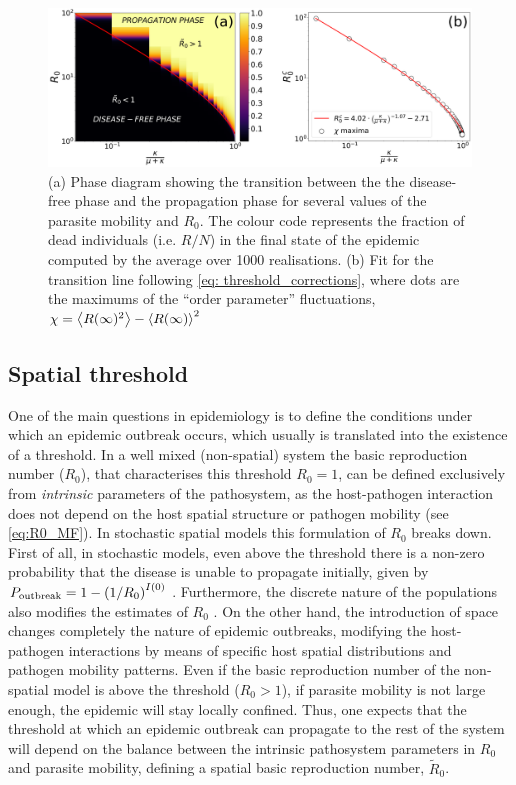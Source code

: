 \begin{figure}[t!]
    \centering
    \includegraphics[width=1\textwidth]{Figures/PhaseDiagram.png}
    \caption{(a) Phase diagram showing the transition between the the
        disease-free phase and the propagation phase for several values of the
        parasite
        mobility and $R_0$. The colour code represents the fraction of dead
        individuals
        (i.e. $R/N$) in the final state of the epidemic computed by the average
        over
        1000 realisations. (b) Fit for the transition line following \cref{eq:
            threshold_corrections}, where dots are the maximums of the ``order
        parameter''
        fluctuations, $\chi=\left<{R(\infty})^2\right>-\left<R(\infty)\right>^2$}
    \label{fig:Phase_diagram}
\end{figure}

\subsection{Spatial threshold}

One of the main questions in epidemiology is to define the conditions under
which an epidemic outbreak occurs, which usually is translated into the
existence of a threshold. In a well mixed (non-spatial) system the basic
reproduction number ($R_0$), that characterises this threshold $R_0=1$, can be
defined exclusively from \textit{intrinsic} parameters of the pathosystem, as
the host-pathogen interaction does not depend on the host spatial structure or
pathogen mobility (see \cref{eq:R0_MF}). In stochastic spatial models this
formulation of $R_0$ breaks down. First of all, in stochastic models, even
above the threshold there is a non-zero probability that the disease is unable
to propagate initially, given by
$P_{\textrm{outbreak}}=1-\left(1/R_0\right)^{I(0)}$ \cite{Brauer2008}.
Furthermore, the discrete nature of the populations also modifies the estimates
of $R_0$ \cite{KEELING200051}. On the other hand, the introduction of space
changes completely the nature of epidemic outbreaks, modifying the
host-pathogen interactions by means of specific host spatial distributions and
pathogen mobility patterns. Even if the basic reproduction number of the
non-spatial model is above the threshold ($R_0>1$), if parasite mobility is not
large enough, the epidemic will stay locally confined. Thus, one expects that
the threshold at which an epidemic outbreak can propagate to the rest of the
system will depend on the balance between the intrinsic pathosystem parameters
in $R_0$ and parasite mobility, defining a spatial basic reproduction number,
$\tilde{R}_0$.

